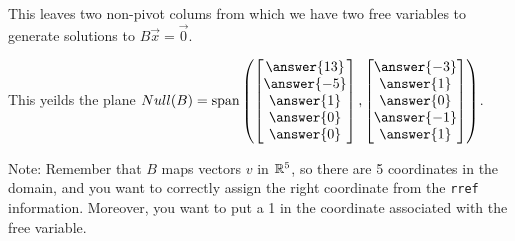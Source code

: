 \documentclass{ximera}
\begin{document}
\begin{example}
  This leaves two non-pivot colums from which we have two free variables to generate solutions to $B\vec{x}=\vec{0}$. 

  This yeilds the plane $Null(B)=\text{span}\left( \begin{bmatrix} 
    \answer{13} \\ 
    \answer{-5} \\ 
    \answer{1} \\ 
    \answer{0} \\ 
    \answer{0} 
    \end{bmatrix}, 
    \begin{bmatrix} 
    \answer{-3} \\ 
    \answer{1} \\ 
    \answer{0} \\ 
    \answer{-1} \\ 
    \answer{1} 
    \end{bmatrix}\right)$.
\end{example}

\begin{hint}
Note: Remember that $B$ maps vectors $v$ in $\mathbb{R}^5$, so there are 5 coordinates in the domain, and you want to correctly assign the right coordinate from the \texttt{rref} information. Moreover, you want to put a 1 in the coordinate associated with the free variable. 
\end{hint}
 
\end{document}
